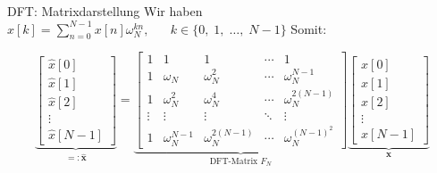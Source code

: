 \documentclass[14pt, aspectratio=169, handout]{beamer}
\begin{document}
\begin{frame}{DFT: Matrixdarstellung}
    Wir haben $\hat{x}[k] = \displaystyle\sum_{n=0}^{N-1} x[n]\omega_N^{kn}, \hspace{20pt} k \in \{ 0, \; 1, \; \dots, \; N-1 \}$ Somit:

$$\underbrace{\begin{bmatrix}
    \hat{x}[0] \\
    \hat{x}[1] \\
    \hat{x}[2] \\
    \vdots \\
    \hat{x}[N-1]
\end{bmatrix}}_{=: \hat{\mathbf{x}}} = \underbrace{\begin{bmatrix}
    1 & 1 & 1 & \cdots & 1 \\
    1 & \omega_N & \omega_N^2 & \cdots & \omega_N^{N-1} \\
    1 & \omega_N^2 & \omega_N^4 & \cdots & \omega_N^{2(N-1)} \\
    \vdots & \vdots & \vdots & \ddots & \vdots \\
    1 & \omega_N^{N-1} & \omega_N^{2(N-1)} & \cdots & \omega_N^{(N-1)^2}
\end{bmatrix}}_{\text{DFT-Matrix } F_N} \underbrace{\begin{bmatrix}
    x[0] \\
    x[1] \\
    x[2] \\
    \vdots \\
    x[N-1]
\end{bmatrix}}_{\mathbf{x}}$$

\end{frame}
\end{document}
